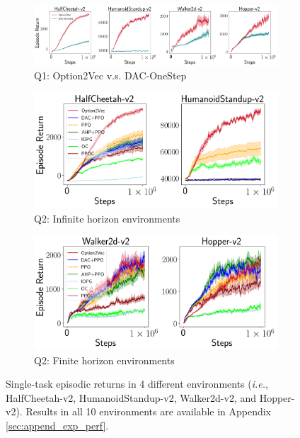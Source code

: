 \documentclass{article}
\begin{document}
\begin{figure}[thb]
  \vspace{-4mm}
  \begin{subfigure}{1\textwidth}
    \centering
    \includegraphics[width=1\linewidth]{figures/ET4.png}
    \vspace{-6mm}
    \caption{\label{fig:ET4}\small Q1: Option2Vec
      v.s. DAC-OneStep}
  \end{subfigure}
  \newline
  \begin{subfigure}{.5\textwidth}
    \centering
    \includegraphics[width=1\linewidth]{figures/Inf2.png}
    \vspace{-6mm}
    \caption{\small Q2: Infinite horizon environments}
    \label{fig:exp_inf}
  \end{subfigure}
  \begin{subfigure}{.5\textwidth}
    \centering
    \includegraphics[width=1\linewidth]{figures/F2.png}
    \vspace{-6mm}
    \caption{\small Q2: Finite horizon environments}
    \label{fig:exp_finite}
  \end{subfigure}
  \vspace{-2mm}
  \caption{\small Single-task episodic returns in 4 different environments (\textit{i.e.}, HalfCheetah-v2, HumanoidStandup-v2, Walker2d-v2, and Hopper-v2). Results in all 10 environments are available in Appendix \ref{sec:append_exp_perf}.}
  \label{fig:exp_dac} 
  \vspace{-4mm}
\end{figure}
\end{document}
